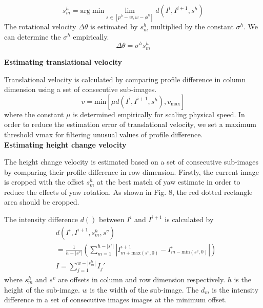 \begin{equation}
	s_m^h = 
		\text{arg} \; \text{min}
		\lim\limits_{s \in [p^h - w, w-\phi^h]}
		d(I^i, I^{i+1}, s^h)
\end{equation}
The rotational velocity $\Delta\theta$ is estimated by $s_m^h$ multiplied by the constant $\sigma^h$. 
We can determine the $\sigma^h$ empirically.
\begin{equation}
	\Delta \theta = \sigma^h s_m^h
\end{equation}


\noindent \textbf{Estimating translational velocity}

Translational velocity is calculated by comparing profile difference in column dimension using a set of consecutive sub-images.
\begin{equation}
	v = \text{min} [ \mu d(I^i, I^{i+1}, s^h), v_{\text{max}} ]
\end{equation}
where the constant $\mu$ is determined empirically for scaling physical speed. 
In order to reduce the estimation error of translational velocity, we set a maximum threshold vmax for filtering unusual values of profile difference.
\\

\noindent \textbf{Estimating height change velocity}

The height change velocity is estimated based on a set of consecutive sub-images by comparing their profile difference in row dimension. 
Firstly, the current image is cropped with the offset $s_m^h$ at the best match of yaw estimate in order to reduce the effects of yaw rotation. 
As shown in Fig. 8, the red dotted rectangle area should be cropped.


The intensity difference $d()$ between $I^i$ and $I^{i+1}$ is calculated by
\begin{equation}
	\begin{aligned}
		& d(I^i, I^{i+1}, s_m^h, s^v) \\
		& = \frac{1}{h - |s^v|}
			( \sum_{m=1}^{h-|s^v|} | I_{m+\text{max}(s^v,0)}^{i+1} - I_{m - \text{min}(s^v, 0)} ^i | ) \\
		& I = \sum_{j=1}^{w-|s_m^h|} I_j'
	\end{aligned}
\end{equation}
where $ s_m^h $ and $ s^v $ are offsets in column and row dimension respectively.
$ h $ is the height of the sub-image.
$ w $ is the width of the sub-image.
The $ d_m $ is the intensity difference in a set of consecutive images images at the minimum offset.

